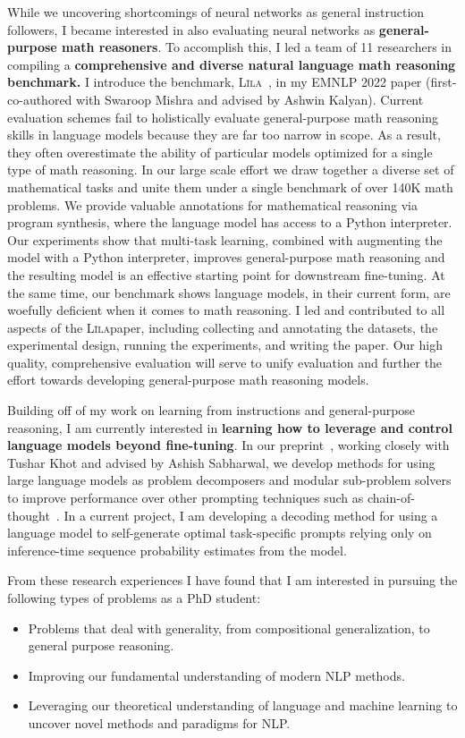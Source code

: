 \documentclass[12pt]{article}
\newcommand\lila{\textsc{L\={\i}la}}
\begin{document}
While we uncovering shortcomings of neural networks 
as general instruction followers,
I became interested in also evaluating neural networks as 
\textbf{general-purpose math reasoners}.
To accomplish this,
I led a team of 11 researchers in compiling a
\textbf{comprehensive and diverse natural language math reasoning benchmark.} 
I introduce the benchmark, \lila~\cite{Mishra2022Lila}, 
in my EMNLP 2022 paper (first-co-authored with Swaroop Mishra and advised by Ashwin Kalyan).
Current evaluation schemes fail to holistically evaluate 
general-purpose math reasoning skills in language models
because they are far too narrow in scope. 
As a result, they often overestimate the ability 
of particular models optimized for a single type of math reasoning.
In our large scale effort we draw together a diverse set of mathematical tasks 
and unite them under a single benchmark of over 140K math problems.
We provide valuable annotations for mathematical reasoning via program synthesis, 
where the language model has access to a Python interpreter.
Our experiments show that multi-task learning, 
combined with augmenting the model with a Python interpreter,
improves general-purpose math reasoning
and the resulting model is an effective starting point 
for downstream fine-tuning. 
At the same time, our benchmark shows language models, 
in their current form, 
are woefully deficient when it comes to math reasoning.
I led and contributed to all aspects of the \lila paper,
including collecting and annotating the datasets,
the experimental design, running the experiments, and writing the paper.
Our high quality, comprehensive evaluation  
will serve to unify evaluation
and further the effort towards developing general-purpose math reasoning models.

Building off of my work 
on learning from instructions and general-purpose reasoning, 
I am currently interested in
\textbf{learning how to leverage and control language models beyond fine-tuning}.
In our preprint~\cite{Khot2022DecomposedPA}, working closely with Tushar Khot and advised by Ashish Sabharwal, we develop methods for using large language models 
as problem decomposers and modular sub-problem solvers to improve performance over 
other prompting techniques such as chain-of-thought~\cite{}. 
In a current project, 
I am developing a decoding method for using a language model 
to self-generate optimal task-specific prompts 
relying only on inference-time sequence probability estimates from the model.

From these research experiences I have found that 
I am interested in pursuing the following types of problems as a PhD student:
\begin{itemize}
  \item Problems that deal with generality,
    from compositional generalization, to general purpose reasoning.
  \item Improving our fundamental understanding of modern NLP methods. 
  \item Leveraging our theoretical understanding of language and machine learning
    to uncover novel methods and paradigms for NLP. 
\end{itemize}
\end{document}
